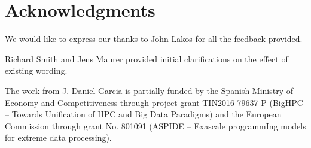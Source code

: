\section*{Acknowledgments}

We would like to express our thanks to John Lakos for all the feedback provided.

Richard Smith and Jens Maurer provided initial clarifications on the effect of
existing wording.

The work from J. Daniel Garcia is partially funded by
the Spanish Ministry of Economy and Competitiveness through project grant
TIN2016-79637-P (BigHPC -- Towards Unification of HPC and Big Data Paradigms)
and the European Commission through grant
No. 801091 (ASPIDE -- Exascale programmIng models for extreme data processing).

